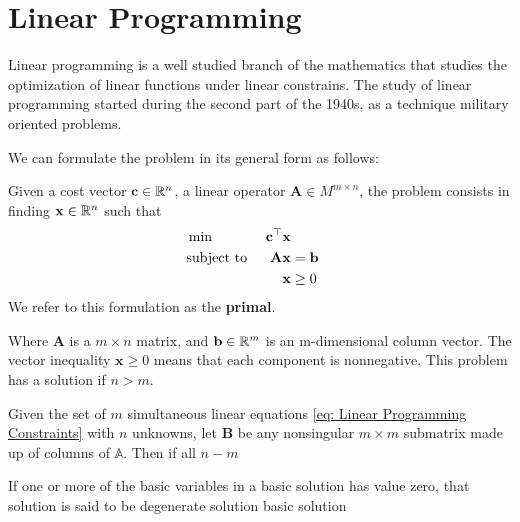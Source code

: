 \chapter{Linear Programming}
Linear programming is a well studied branch of the mathematics that studies the optimization of linear functions under linear constrains. The study of linear programming started during the second part of the 1940s, as a technique military oriented problems.

We can formulate the problem in its general form as follows:

\begin{problem}
\label{pro: Linear Programming General Formulation.}
Given a cost vector $\mathbf{c}\in \mathbb{R}^n$, a linear operator $\mathbf{A} \in M^{m\times n}$, the problem consists in finding $\mathbf{x}\in\mathbb{R}^n$ such that 
\begin{align}
	&\min & \mathbf{c}^\top\mathbf{x} \label{eq: Linear Programming Min}&\\
	&\text{subject to }& \mathbf{A}\mathbf{x}&=\mathbf{b} & \label{eq: Linear Programming Constraints} \\
	& &\mathbf{x}&\geq 0 & \label{eq: Linear Programming cone}
\end{align} 
We refer to this formulation as the \textbf{primal}.
\end{problem}
Where $\mathbf{A}$ is a $m\times n$ matrix, and $\mathbf{b}\in\mathbb{R}^m$ is an m-dimensional column vector. The vector inequality $\mathbf{x}\geq 0$ means that each component is nonnegative. This problem has a solution if $n>m$. 

\begin{definition}
	Given the set of $m$ simultaneous linear equations \eqref{eq: Linear Programming Constraints} with $n$ unknowns, let $\mathbf{B}$ be any nonsingular $m\times m$ submatrix made up of columns of $\mathbb{A}$. Then if all $n-m$ 
\end{definition}

\begin{definition}
	If one or more of the basic variables in a basic solution has value zero, that solution is said to be degenerate solution basic solution
\end{definition}

